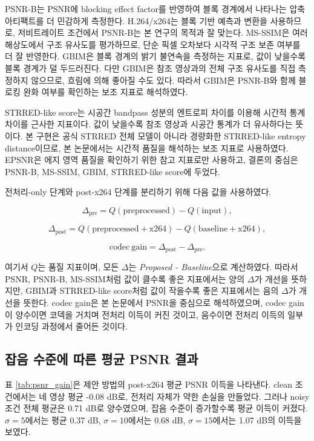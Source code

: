 \documentclass[10pt]{article}
\begin{document}
PSNR-B는 PSNR에 blocking effect factor를 반영하여 블록 경계에서 나타나는 압축 아티팩트를 더 민감하게 측정한다. H.264/x264는 블록 기반 예측과 변환을 사용하므로, 저비트레이트 조건에서 PSNR-B는 본 연구의 목적과 잘 맞는다. MS-SSIM은 여러 해상도에서 구조 유사도를 평가하므로, 단순 픽셀 오차보다 시각적 구조 보존 여부를 더 잘 반영한다. GBIM은 블록 경계의 밝기 불연속을 측정하는 지표로, 값이 낮을수록 블록 경계가 덜 두드러진다. 다만 GBIM은 참조 영상과의 전체 구조 유사도를 직접 측정하지 않으므로, 흐림에 의해 좋아질 수도 있다. 따라서 GBIM은 PSNR-B와 함께 블로킹 완화 여부를 확인하는 보조 지표로 해석하였다.

STRRED-like score는 시공간 bandpass 성분의 엔트로피 차이를 이용해 시간적 통계 차이를 근사한 지표이다. 값이 낮을수록 참조 영상과 시공간 통계가 더 유사하다는 뜻이다. 본 구현은 공식 STRRED 전체 모델이 아니라 경량화한 STRRED-like entropy distance이므로, 본 논문에서는 시간적 품질을 해석하는 보조 지표로 사용하였다. EPSNR은 에지 영역 품질을 확인하기 위한 참고 지표로만 사용하고, 결론의 중심은 PSNR-B, MS-SSIM, GBIM, STRRED-like score에 두었다.

전처리-only 단계와 post-x264 단계를 분리하기 위해 다음 값을 사용하였다.

\begin{equation}
\Delta_{\mathrm{pre}} = Q(\mathrm{preprocessed}) - Q(\mathrm{input}),
\end{equation}

\begin{equation}
\Delta_{\mathrm{post}} = Q(\mathrm{preprocessed+x264}) - Q(\mathrm{baseline+x264}),
\end{equation}

\begin{equation}
\mathrm{codec\ gain} = \Delta_{\mathrm{post}} - \Delta_{\mathrm{pre}}.
\end{equation}

여기서 $Q$는 품질 지표이며, 모든 $\Delta$는 \textit{Proposed - Baseline}으로 계산하였다. 따라서 PSNR, PSNR-B, MS-SSIM처럼 값이 클수록 좋은 지표에서는 양의 $\Delta$가 개선을 뜻하지만, GBIM과 STRRED-like score처럼 값이 작을수록 좋은 지표에서는 음의 $\Delta$가 개선을 뜻한다. codec gain은 본 논문에서 PSNR을 중심으로 해석하였으며, codec gain이 양수이면 코덱을 거치며 전처리 이득이 커진 것이고, 음수이면 전처리 이득의 일부가 인코딩 과정에서 줄어든 것이다.

\subsection{잡음 수준에 따른 평균 PSNR 결과}
표 \ref{tab:psnr_gain}은 제안 방법의 post-x264 평균 PSNR 이득을 나타낸다. clean 조건에서는 네 영상 평균 -0.08 dB로, 전처리 자체가 약한 손실을 만들었다. 그러나 noisy 조건 전체 평균은 0.71 dB로 양수였으며, 잡음 수준이 증가할수록 평균 이득이 커졌다. $\sigma=5$에서는 평균 0.37 dB, $\sigma=10$에서는 0.68 dB, $\sigma=15$에서는 1.07 dB의 이득을 보였다.
\end{document}
